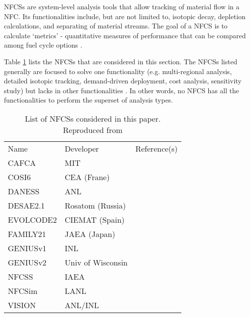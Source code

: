 \glspl{NFCS} are system-level analysis tools
that allow tracking of material flow in a \gls{NFC}. Its
functionalities include, but are not limited to, isotopic decay,
depletion calculations, and separating of material streams.
The goal of a \gls{NFCS} is to calculate `metrics' - quantitative
measures of performance that can be compared among fuel cycle
options \cite{huff_fundamental_2016}.

Table \ref{tab:fcs} lists the \glspl{NFCS}
that are considered in this section. The \glspl{NFCS}
listed generally are focused to solve one functionality
(e.g. multi-regional analysis, detailed isotopic tracking,
demand-driven deployment, cost analysis, sensitivity study)
but lacks in other functionalities \cite{huff_next_2010}. In
other words, no \gls{NFCS} has all the functionalities to
perform the superset of analysis types.

\begin{table}[h]
    \centering
    \caption{List of \glspl{NFCS} considered in this paper.
             Reproduced from \cite{huff_next_2010}}
    \label{tab:fcs}
    \begin{tabular}{lll}
        \hline
        Name & Developer & Reference(s) \\
        CAFCA & MIT & \cite{guerin_benchmark_2009}\\
        COSI6 & CEA (Frane) & \cite{meyer_new_2009} \\
        DANESS & ANL & \cite{van_daness:_2006}\\
        DESAE2.1 & Rosatom (Russia) & \cite{tsibulskiy_desae_2006}\\
        EVOLCODE2 & CIEMAT (Spain) & \cite{alvaerz-velarde_validation_2014}\\
        FAMILY21 & JAEA (Japan) & \cite{oecd_nuclear_2009}\\
        GENIUSv1 & INL & \cite{dunzik-gougar_global_2007}\\
        GENIUSv2 & Univ of Wisconsin & \cite{dunn_genius_2009}\\
        NFCSS & IAEA & \cite{iaea_guidance_2008}\\
        NFCSim & LANL & \cite{schneider_nfcsim:_2005} \\
        VISION & ANL/INL & \cite{jacobson_verifiable_2010} \\
        \hline
    \end{tabular}
\end{table}


